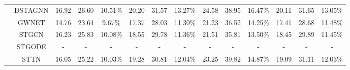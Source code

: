 \begin{table}[t]
{\begin{tabular}{c|c|c|c|c|c|c|c|c|c|c|c|c|c}
 & DSTAGNN & 16.92 & 26.60 & 10.51\% & 20.20 & 31.57 & 13.27\% & 24.58 & 38.95 & 16.47\% & 20.11 & 31.65 & 13.05\% \\
 & GWNET & 14.76 & 23.64 & 9.67\% & 17.37 & 28.03 & 11.30\% & 21.23 & 36.52 & 14.25\% & 17.41 & 28.68 & 11.48\% \\
 & STGCN & 16.23 & 25.83 & 10.08\% & 18.55 & 29.78 & 11.36\% & 21.51 & 35.81 & 13.50\% & 18.45 & 29.89 & 11.45\% \\
 & STGODE & - & - & - & - & - & - & - & - & - & - & - & - \\
 & STTN & 16.05 & 25.22 & 10.03\% & 19.28 & 30.81 & 12.04\% & 23.25 & 39.82 & 14.87\% & 19.09 & 31.11 & 12.03\% \\
\bottomrule
\end{tabular}
}
\end{table}

